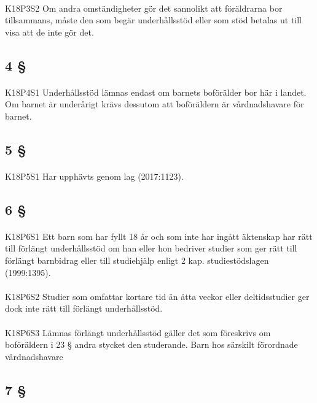 \documentclass[a4paper,notitlepage,openany,10pt]{book}
\begin{document}
\paragraph*{}
{\tiny K18P3S2}
Om andra omständigheter gör det sannolikt att föräldrarna bor tillsammans, måste den som begär underhållsstöd eller som stöd betalas ut till visa att de inte gör det.
\subsection*{4 §}
\paragraph*{}
{\tiny K18P4S1}
Underhållsstöd lämnas endast om barnets boförälder bor här i landet. Om barnet är underårigt krävs dessutom att boföräldern är vårdnadshavare för barnet.
\subsection*{5 §}
\paragraph*{}
{\tiny K18P5S1}
Har upphävts genom
lag (2017:1123).
\subsection*{6 §}
\paragraph*{}
{\tiny K18P6S1}
Ett barn som har fyllt 18 år och som inte har ingått äktenskap har rätt till förlängt underhållsstöd om han eller hon bedriver studier som ger rätt till förlängt barnbidrag eller till studiehjälp enligt 2 kap. studiestödslagen (1999:1395).
\paragraph*{}
{\tiny K18P6S2}
Studier som omfattar kortare tid än åtta veckor eller deltidsstudier ger dock inte rätt till förlängt underhållsstöd.
\paragraph*{}
{\tiny K18P6S3}
Lämnas förlängt underhållsstöd gäller det som föreskrivs om boföräldern i 23 § andra stycket den studerande.
Barn hos särskilt förordnade vårdnadshavare
\subsection*{7 §}
\end{document}
